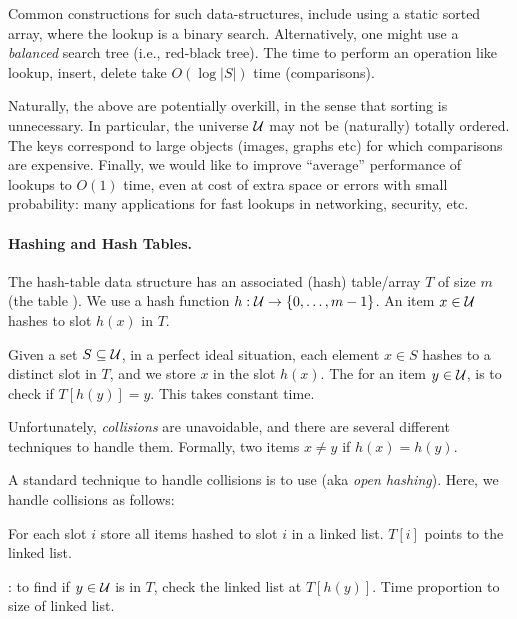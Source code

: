 \bigskip%

Common constructions for such data-structures, include using a static
sorted array, where the lookup is a binary search. Alternatively, one
might use a \emph{balanced} search tree (i.e., red-black tree). The
time to perform an operation like lookup, insert, delete take
$O(\log |S|)$ time (comparisons).

Naturally, the above are potentially overkill, in the sense that sorting
is unnecessary. In particular, the universe $\mathcal{U}$ may not be (naturally)
totally ordered.  The keys correspond to large objects (images, graphs
etc) for which comparisons are expensive.  Finally, we would like to
improve ``average'' performance of lookups to $O(1)$ time, even at cost
of extra space or errors with small probability: many applications for
fast lookups in networking, security, etc.


\paragraph*{Hashing and Hash Tables.}%

The hash-table data structure has an associated (hash) table/array $T$ of
size $m$ (the table ).  We use a hash function
$h: \mathcal{U} \rightarrow \{0,\ldots,m-1\}$. An item $x \in \mathcal{U}$ hashes to slot
$h(x)$ in $T$.


Given a set $S \subseteq \mathcal{U}$, in a perfect ideal situation, each
element $x \in S$ hashes to a distinct slot in $T$, and we store $x$
in the slot $h(x)$. The  for an item $y \in \mathcal{U}$, is
to check if $T[h(y)] = y$. This takes constant time.

Unfortunately, \emph{collisions} are unavoidable, and there are several
different techniques to handle them.  Formally, two items $x \neq y$
 if $h(x) = h(y)$.

A standard technique to handle collisions is to use 
(aka \emph{open hashing}). Here, we handle collisions as follows:
\smallskip%
\begin{compactenumA}
    \item For each slot $i$ store all items hashed to slot $i$ in a
    linked list. $T[i]$ points to the linked list.
    
    \smallskip%
    \item {}: to find if $y \in \mathcal{U}$ is in $T$, check
    the linked list at $T[h(y)]$. Time proportion to size of linked
    list.
\end{compactenumA}


